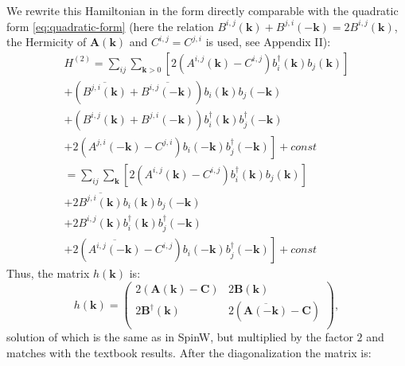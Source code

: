 \documentclass[a4paper,12pt]{article}
\begin{document}
            We rewrite this Hamiltonian in the form directly comparable with the quadratic form \eqref{eq:quadratic-form} 
            (here the relation $B^{i,j}(\boldsymbol{k}) + B^{j,i}(-\boldsymbol{k}) = 2B^{i,j}(\boldsymbol{k})$, 
            the Hermicity of $\boldsymbol{A}(\boldsymbol{k})$ and $C^{i,j} = C^{j,i}$ is used, see Appendix II):
            \begin{multline}
                H^{(2)} = \sum_{ij}\sum_{\boldsymbol{k} > 0}\left[2(A^{i,j}(\boldsymbol{k}) - C^{i,j})b^{\dag}_{i}(\boldsymbol{k})b_{j}(\boldsymbol{k})\right] \\
                +(\overline{B^{j,i}(\boldsymbol{k})} + \overline{B^{i,j}(-\boldsymbol{k})})b_i(\boldsymbol{k})b_{j}(-\boldsymbol{k}) \\
                +(B^{i,j}(\boldsymbol{k}) + B^{j,i}(-\boldsymbol{k}))b^{\dag}_{i}(\boldsymbol{k})b^{\dag}_{j}(-\boldsymbol{k})\\
                +\left.2(A^{j,i}(-\boldsymbol{k}) - C^{j,i})b_{i}(-\boldsymbol{k})b^{\dag}_{j}(-\boldsymbol{k})\right] + const\\
                = \sum_{ij}\sum_{\boldsymbol{k}}\left[2(A^{i,j}(\boldsymbol{k}) - C^{i,j})b^{\dag}_{i}(\boldsymbol{k})b_{j}(\boldsymbol{k})\right] \\
                +2\overline{B^{j,i}(\boldsymbol{k})}b_i(\boldsymbol{k})b_{j}(-\boldsymbol{k}) \\
                +2B^{i,j}(\boldsymbol{k})b^{\dag}_{i}(\boldsymbol{k})b^{\dag}_{j}(-\boldsymbol{k})\\
                +\left.2(\overline{A^{i,j}(-\boldsymbol{k})} - C^{i,j})b_{i}(-\boldsymbol{k})b^{\dag}_{j}(-\boldsymbol{k})\right] + const 
            \end{multline}
            Thus, the matrix $h(\boldsymbol{k})$ is:
            \begin{equation}
                h(\boldsymbol{k}) = 
                \begin{pmatrix}
                    2(\boldsymbol{A}(\boldsymbol{k}) - \boldsymbol{C}) & 2\boldsymbol{B}(\boldsymbol{k}) \\
                    2\boldsymbol{B}^{\dag}(\boldsymbol{k}) & 2(\overline{\boldsymbol{A}(-\boldsymbol{k})} - \boldsymbol{C}) \\
                \end{pmatrix},\label{eq:matrix-colpa}
            \end{equation}
            solution of which is the same as in SpinW, but multiplied by the factor $2$ and matches with the textbook results. After the diagonalization the matrix is:
\end{document}
